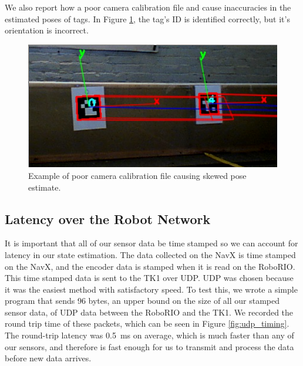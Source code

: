 \documentclass{article}
\begin{document}
    We also report how a poor camera calibration file and cause inaccuracies in the estimated poses of tags. In Figure \ref{fig:bad_tag_pose}, the tag's ID is identified correctly, but it's orientation is incorrect.

    \begin{figure}[H]
      \centering
      \includegraphics[width=1\linewidth]{./images/bad_tag_pose_1.png}
      \caption{Example of poor camera calibration file causing skewed pose estimate.}
      \label{fig:bad_tag_pose}
    \end{figure}

	\subsection{Latency over the Robot Network}

		It is important that all of our sensor data be time stamped so we can account for latency in our state estimation. The data collected on the NavX is time stamped on the NavX, and the encoder data is stamped when it is read on the RoboRIO. This time stamped data is sent to the TK1 over UDP. UDP was chosen because it was the easiest method with satisfactory speed. To test this, we wrote a simple program that sends 96 bytes, an upper bound on the size of all our stamped sensor data, of UDP data between the RoboRIO and the TK1. We recorded the round trip time of these packets, which can be seen in Figure \ref{fig:udp_timing}. The round-trip latency was \SI{0.5}{\milli\second} on average, which is much faster than any of our sensors, and therefore is fast enough for us to transmit and process the data before new data arrives.
\end{document}
